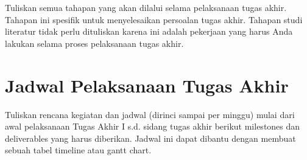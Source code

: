 Tuliskan semua tahapan yang akan dilalui selama pelaksanaan tugas akhir.
Tahapan ini spesifik untuk menyelesaikan persoalan tugas akhir. Tahapan studi
literatur tidak perlu dituliskan karena ini adalah pekerjaan yang harus Anda
lakukan selama proses pelaksanaan tugas akhir.

\section{Jadwal Pelaksanaan Tugas Akhir}

Tuliskan rencana kegiatan dan jadwal (dirinci sampai per minggu) mulai dari
awal pelaksanaan Tugas Akhir I s.d. sidang tugas akhir berikut milestones dan
deliverables yang harus diberikan. Jadwal ini dapat dibantu dengan membuat
sebuah tabel timeline atau gantt chart.
